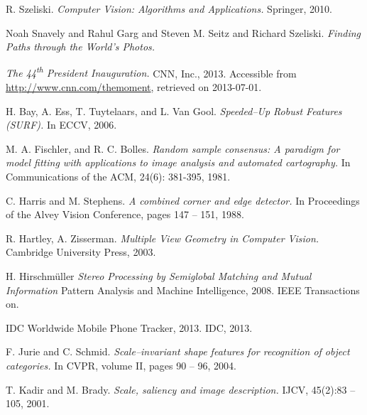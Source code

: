 
\def\bibname{Bibliography}
\begin{thebibliography}{99}
\addcontentsline{toc}{chapter}{\bibname}

  {\sc R. Szeliski.}
  \emph{Computer Vision: Algorithms and Applications.}
  Springer, 2010. 

  {\sc Noah Snavely and Rahul Garg and Steven M. Seitz and Richard Szeliski.} 
  \emph{Finding Paths through the World's Photos.}

  \emph{The 44\textsuperscript{th} President Inauguration.}
  CNN, Inc., 2013. Accessible from \url{http://www.cnn.com/themoment}, retrieved on 2013-07-01.

  {\sc  H. Bay, A. Ess, T. Tuytelaars, and L. Van Gool.}
  \emph{Speeded–Up Robust Features (SURF).}
  In ECCV, 2006.

  {\sc M. A. Fischler, and R. C. Bolles.} 
  \emph{Random sample consensus: A paradigm for model fitting with applications to image analysis and automated cartography.} 
  In Communications of the ACM, 24(6): 381-395, 1981.

  {\sc C. Harris and M. Stephens.} 
  \emph{A combined corner and edge detector.}
  In Proceedings of the Alvey Vision Conference, pages 147 – 151, 1988.

  {\sc  R. Hartley, A. Zisserman.}
  \emph{Multiple View Geometry in Computer Vision.}
  Cambridge University Press, 2003.

  {\sc  H. Hirschmüller}
  \emph{Stereo Processing by Semiglobal Matching and Mutual Information}
  Pattern Analysis and Machine Intelligence, 2008. IEEE Transactions on.

  IDC Worldwide Mobile Phone Tracker, 2013. IDC, 2013.

  {\sc F. Jurie and C. Schmid.} 
  \emph{Scale–invariant shape features for recognition of object categories.}
  In CVPR, volume II, pages 90 – 96, 2004.

  {\sc T. Kadir and M. Brady.} 
  \emph{Scale, saliency and image description.}
  IJCV, 45(2):83 – 105, 2001.
  

\end{thebibliography}
